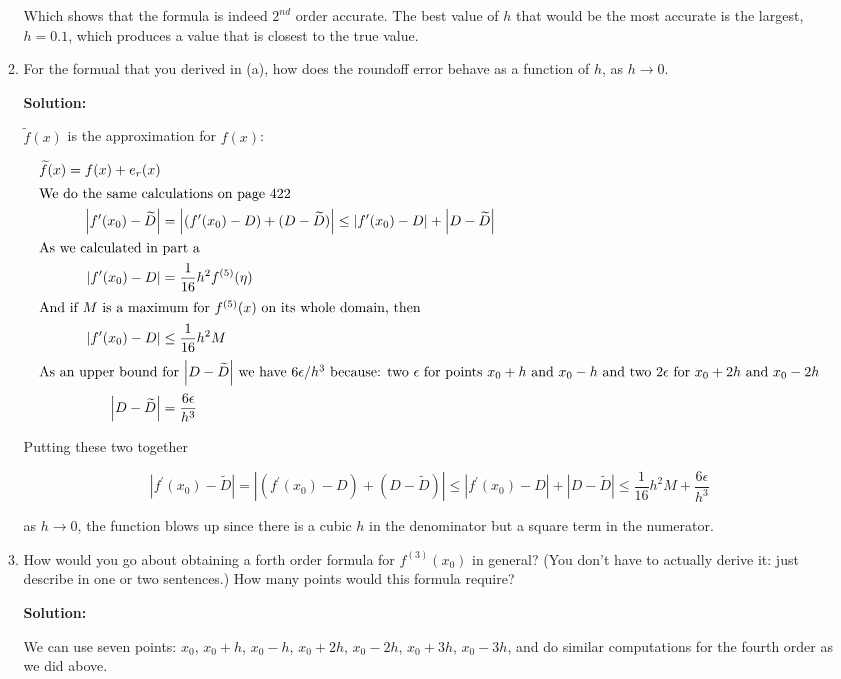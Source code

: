\documentclass[12pt]{article}
\newcommand{\abs}[1]{\left| #1 \right|}
\begin{document}
\begin{enumerate}
\begin{enumerate}
Which shows that the formula is indeed $2^{nd}$ order accurate. The best value of $h$ that would be the most accurate is the largest, $h = 0.1$, which produces a value that is closest to the true value.

\item For the formual that you derived in (a), how does the roundoff error behave as a function of $h$, as $h\rightarrow 0$.

{\bf Solution:}

$\widetilde{f}(x)$ is the approximation for $f(x)$:

\begin{align*}
\widetilde{f}(x) = f(x) + e_{r}(x)\\
\intertext{We do the same calculations on page 422}
\abs{f^{\prime}(x_{0}) - \widetilde{D}} &= \abs{ (f^{\prime}(x_{0}) - D) + (D - \widetilde{D})} \leq \abs{ f^{\prime}(x_{0}) - D} + \abs{D - \widetilde{D}}\\
\intertext{As we calculated in part a}
\abs{f^{\prime}(x_{0}) - D} &= \frac{1}{16}h^{2}f^{(5)}(\eta)\\
\intertext{And if $M$ is a maximum for $f^{(5)}(x)$ on its whole domain, then}
\abs{f^{\prime}(x_{0}) - D} &\leq \frac{1}{16}h^{2}M\\
\intertext{As an upper bound for $\abs{D - \widetilde{D}}$ we have $6\epsilon/h^{3}$ because: two $\epsilon$ for points $x_{0} + h$ and $x_{0} - h$ and two $2\epsilon$ for $x_{0} + 2h$ and $x_{0} - 2h$}
\abs{D - \widetilde{D}} &= \frac{6\epsilon}{h^{3}}\\
\end{align*}

Putting these two together

\[
\abs{f^{\prime}(x_{0}) - \widetilde{D}} = \abs{(f^{\prime}(x_{0}) - D) + (D - \widetilde{D})} \leq \abs{f^{\prime}(x_{0}) - D} + \abs{D - \widetilde{D}} \leq \frac{1}{16}h^{2}M + \frac{6\epsilon}{h^{3}}
\]

as $h\rightarrow 0$, the function blows up since there is a cubic $h$ in the denominator but a square term in the numerator.

\item How would you go about obtaining a forth order formula for $f^{(3)}(x_{0})$ in general? (You don't have to actually derive it: just describe in one or two sentences.) How many points would this formula require?

{\bf Solution:}

We can use seven points: $x_{0}$, $x_{0} + h$, $x_{0} - h$, $x_{0} + 2h$, $x_{0} - 2h$, $x_{0} + 3h$, $x_{0} - 3h$, and do similar computations for the fourth order as we did above.
\end{enumerate}


\end{enumerate}
\end{document}
